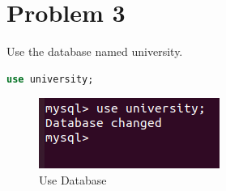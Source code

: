 \documentclass{article}
\begin{document}
\newpage
\section{Problem 3}
Use the database named university.
\begin{lstlisting}[language=sql]
  use university;
\end{lstlisting}
\begin{figure}[!ht]
  \begin{center}
  \includegraphics[scale=0.8]{Q3.png}
  \caption{Use Database}
  \end{center}
\end{figure}

\newpage
\end{document}

